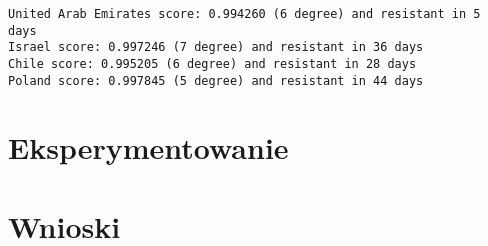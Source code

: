 \documentclass[12pt, oneside]{article}
\begin{document}
\begin{Verbatim}[tabsize=4]
United Arab Emirates score: 0.994260 (6 degree) and resistant in 5 days
Israel score: 0.997246 (7 degree) and resistant in 36 days
Chile score: 0.995205 (6 degree) and resistant in 28 days
Poland score: 0.997845 (5 degree) and resistant in 44 days
\end{Verbatim}

\section{Eksperymentowanie}


\section{Wnioski}
\end{document}
